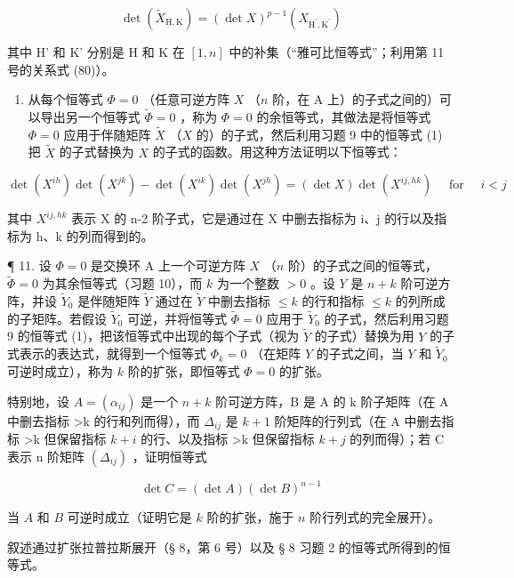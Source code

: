 \[
\det (\tilde {X} _ {\mathrm{H}, \mathrm{K}}) = (\det X) ^ {p - 1} (X _ {\mathrm{H} ^ {\prime}, \mathrm{K} ^ {\prime}})\tag{1}
\]

其中 H' 和 K' 分别是 H 和 K 在 \([1, n]\) 中的补集（“雅可比恒等式”；利用第 11 号的关系式 (80)）。

\begin{enumerate}
\def\labelenumi{\arabic{enumi}.}
\setcounter{enumi}{9}
\tightlist
\item
  从每个恒等式 \(\Phi = 0\) （任意可逆方阵 \(X\) （\(n\) 阶，在 A 上）的子式之间的）可以导出另一个恒等式 \(\tilde{\Phi} = 0\) ，称为 \(\Phi = 0\) 的余恒等式，其做法是将恒等式 \(\Phi = 0\) 应用于伴随矩阵 \(\tilde{X}\) （\(X\) 的）的子式，然后利用习题 9 中的恒等式 (1) 把 \(\tilde{X}\) 的子式替换为 \(X\) 的子式的函数。用这种方法证明以下恒等式：
\end{enumerate}

\[
\det (X ^ {i h}) \det (X ^ {j k}) - \det (X ^ {i k}) \det (X ^ {j h}) = (\det X) \det (X ^ {i j, h k}) \quad \text { for } \quad i <   j
\]

其中 \(X^{ij, hk}\) 表示 X 的 n-2 阶子式，它是通过在 X 中删去指标为 i、j 的行以及指标为 h、k 的列而得到的。

¶ 11. 设 \(\Phi = 0\) 是交换环 A 上一个可逆方阵 \(X\) （\(n\) 阶）的子式之间的恒等式， \(\tilde{\Phi} = 0\) 为其余恒等式（习题 10），而 \(k\) 为一个整数 \(>0\) 。设 \(Y\) 是 \(n + k\) 阶可逆方阵，并设 \(\tilde{Y}_0\) 是伴随矩阵 \(\tilde{Y}\) 通过在 \(\tilde{Y}\) 中删去指标 \(\leqslant k\) 的行和指标 \(\leqslant k\) 的列所成的子矩阵。若假设 \(\tilde{Y}_0\) 可逆，并将恒等式 \(\tilde{\Phi} = 0\) 应用于 \(\tilde{Y}_0\) 的子式，然后利用习题 9 的恒等式 (1)，把该恒等式中出现的每个子式（视为 \(\tilde{Y}\) 的子式）替换为用 \(Y\) 的子式表示的表达式，就得到一个恒等式 \(\Phi_k = 0\) （在矩阵 \(Y\) 的子式之间，当 \(Y\) 和 \(\tilde{Y}_0\) 可逆时成立），称为 \(k\) 阶的扩张，即恒等式 \(\Phi = 0\) 的扩张。

特别地，设 \(A = (\alpha_{ij})\) 是一个 \(n + k\) 阶可逆方阵，B 是 A 的 k 阶子矩阵（在 A 中删去指标 \textgreater k 的行和列而得），而 \(\Delta_{ij}\) 是 \(k + 1\) 阶矩阵的行列式（在 A 中删去指标 \textgreater k 但保留指标 \(k + i\) 的行、以及指标 \textgreater k 但保留指标 \(k + j\) 的列而得）；若 C 表示 n 阶矩阵 \((\Delta_{ij})\) ，证明恒等式

\[
\det C = (\det A) (\det B) ^ {n - 1}
\]

当 \(A\) 和 \(B\) 可逆时成立（证明它是 \(k\) 阶的扩张，施于 \(n\) 阶行列式的完全展开）。

叙述通过扩张拉普拉斯展开（§ 8，第 6 号）以及 § 8 习题 2 的恒等式所得到的恒等式。

